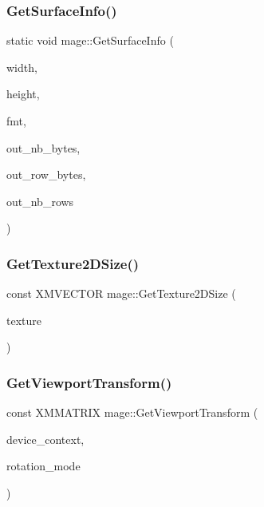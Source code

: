 \hypertarget{namespacemage_a7b67bb6f38f3e787fb3561d236b88bd2}{}\label{namespacemage_a7b67bb6f38f3e787fb3561d236b88bd2} 
\subsubsection{\texorpdfstring{Get\+Surface\+Info()}{GetSurfaceInfo()}}
{\footnotesize\ttfamily static void mage\+::\+Get\+Surface\+Info (\begin{DoxyParamCaption}\item[{\+\_\+\+In\+\_\+ size\+\_\+t}]{width,  }\item[{\+\_\+\+In\+\_\+ size\+\_\+t}]{height,  }\item[{\+\_\+\+In\+\_\+ D\+X\+G\+I\+\_\+\+F\+O\+R\+M\+AT}]{fmt,  }\item[{\+\_\+\+Out\+\_\+opt\+\_\+ size\+\_\+t $\ast$}]{out\+\_\+nb\+\_\+bytes,  }\item[{\+\_\+\+Out\+\_\+opt\+\_\+ size\+\_\+t $\ast$}]{out\+\_\+row\+\_\+bytes,  }\item[{\+\_\+\+Out\+\_\+opt\+\_\+ size\+\_\+t $\ast$}]{out\+\_\+nb\+\_\+rows }\end{DoxyParamCaption})\hspace{0.3cm}{\ttfamily [static]}}

\hypertarget{namespacemage_a32e962380f439a26629371c492643616}{}\label{namespacemage_a32e962380f439a26629371c492643616} 
\subsubsection{\texorpdfstring{Get\+Texture2\+D\+Size()}{GetTexture2DSize()}}
{\footnotesize\ttfamily const X\+M\+V\+E\+C\+T\+OR mage\+::\+Get\+Texture2\+D\+Size (\begin{DoxyParamCaption}\item[{I\+D3\+D11\+Shader\+Resource\+View $\ast$}]{texture }\end{DoxyParamCaption})}

\hypertarget{namespacemage_a706e1b2866209b405f52e62c521f4884}{}\label{namespacemage_a706e1b2866209b405f52e62c521f4884} 
\subsubsection{\texorpdfstring{Get\+Viewport\+Transform()}{GetViewportTransform()}\hspace{0.1cm}{\footnotesize\ttfamily [1/3]}}
{\footnotesize\ttfamily const X\+M\+M\+A\+T\+R\+IX mage\+::\+Get\+Viewport\+Transform (\begin{DoxyParamCaption}\item[{I\+D3\+D11\+Device\+Context $\ast$}]{device\+\_\+context,  }\item[{D\+X\+G\+I\+\_\+\+M\+O\+D\+E\+\_\+\+R\+O\+T\+A\+T\+I\+ON}]{rotation\+\_\+mode }\end{DoxyParamCaption})}

